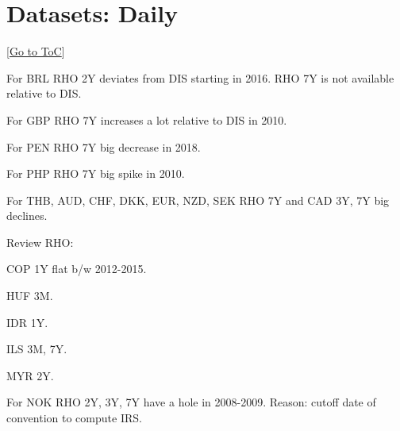 \documentclass[12pt]{article}
\newcommand{\gototoc}{\vspace{-1.8cm} \null\hfill [\hyperlink{toc}{Go to ToC}] \newline}
\newcommand{\cmark}{\ding{51}}
\newcommand{\done}{\rlap{$\square$}{\raisebox{2pt}{\large\hspace{1pt}\cmark}}%
	\hspace{-2.5pt}}
\begin{document}
\section{Datasets: Daily}
\gototoc
\begin{todolist}
	\item For BRL RHO 2Y deviates from DIS starting in 2016. RHO 7Y is not available relative to DIS.
	\item For GBP RHO 7Y increases a lot relative to DIS in 2010.
	\item For PEN RHO 7Y big decrease in 2018.
	\item For PHP RHO 7Y big spike in 2010.
	\item For THB, AUD, CHF, DKK, EUR, NZD, SEK RHO 7Y and CAD 3Y, 7Y big declines.
	\item Review RHO: 
	\begin{todolist}
		\item COP 1Y flat b/w 2012-2015.
		\item HUF 3M.
		\item IDR 1Y.
		\item ILS 3M, 7Y.
		\item MYR 2Y.
	\end{todolist}
	\item[\done] For NOK RHO 2Y, 3Y, 7Y have a hole in 2008-2009. Reason: cutoff date of convention to compute IRS.
\end{todolist}
\end{document}
